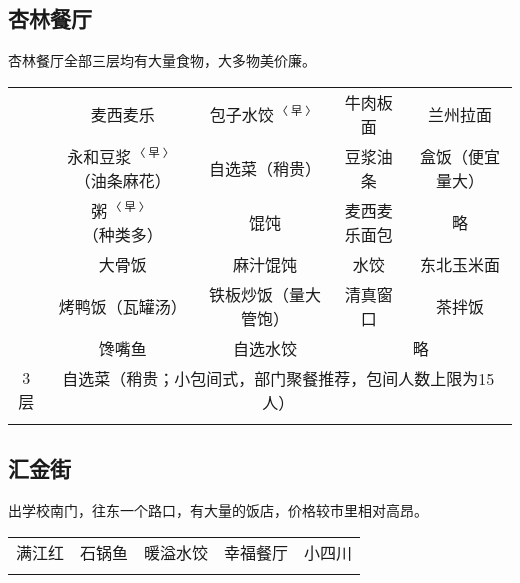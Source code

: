 \subsection[杏林餐厅]{杏林餐厅}
\vspace{-1em}
杏林餐厅全部三层均有大量食物，大多物美价廉。
\newpage
\begin{table}[ht]
    \centering
    \begin{tabular}{|c|c|c|c|c|}
        \Xhline{1.2pt}
        \multirow{3}{*}{1层} & 麦西麦乐                                                & 包子水饺$^{〈早〉}$ & 牛肉板面                   & 兰州拉面     \\
        \cline{2-5}
                            & 永和豆浆$^{〈早〉}$（油条麻花）                                  & 自选菜（稍贵）      & 豆浆油条                   & 盒饭（便宜量大） \\
        \cline{2-5}
                            & 粥$^{〈早〉}$（种类多）                                      & 馄饨           & 麦西麦乐面包                 & 略        \\
        \Xhline{1.2pt}
        \multirow{3}{*}{2层} & 大骨饭                                                 & 麻汁馄饨         & 水饺                     & 东北玉米面    \\
        \cline{2-5}
                            & 烤鸭饭（瓦罐汤）                                            & 铁板炒饭（量大管饱）   & 清真窗口                   & 茶拌饭      \\
        \cline{2-5}
                            & 馋嘴鱼                                                 & 自选水饺         & \multicolumn{2}{c|}{略}            \\
        \Xhline{1.2pt}
        3层\footnotemark     & \multicolumn{4}{c|}{自选菜（稍贵；小包间式，部门聚餐推荐，包间人数上限为15人）}                                                    \\
        \Xhline{1.2pt}
    \end{tabular}
\end{table}

\subsection[汇金街]{汇金街}
\vspace{-1em}
出学校南门，往东一个路口，有大量的饭店，价格较市里相对高昂。
\begin{table}[ht]
    \centering
    \begin{tabular}{|c|c|c|c|c|}
        \Xhline{1.2pt}
        满江红 & 石锅鱼 & 暖溢水饺 & 幸福餐厅 & 小四川 \\
        \Xhline{1.2pt}
    \end{tabular}
\end{table}

